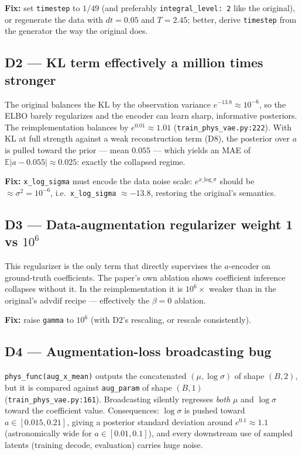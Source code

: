 \documentclass[11pt,a4paper]{article}
\newcommand{\code}[1]{\texttt{#1}}
\begin{document}
\textbf{Fix:} set \code{timestep} to $1/49$ (and preferably \code{integral\_level: 2}
like the original), or regenerate the data with $dt = 0.05$ and $T = 2.45$; better,
derive \code{timestep} from the generator the way the original does.

\subsection*{D2 --- KL term effectively a million times stronger}

The original balances the KL by the observation variance $e^{-13.8} \approx 10^{-6}$,
so the ELBO barely regularizes and the encoder can learn sharp, informative
posteriors. The reimplementation balances by $e^{0.01} \approx 1.01$
(\code{train\_phys\_vae.py:222}). With KL at full strength against a weak
reconstruction term (D8), the posterior over $a$ is pulled toward the prior ---
mean $0.055$ --- which yields an MAE of $\mathbb{E}|a - 0.055| \approx 0.025$: exactly
the collapsed regime.

\textbf{Fix:} \code{x\_log\_sigma} must encode the data noise scale: $e^{x\_\mathrm{log\_\sigma}}$
should be $\approx \sigma^2 = 10^{-6}$, i.e.\ \code{x\_log\_sigma} $\approx -13.8$,
restoring the original's semantics.

\subsection*{D3 --- Data-augmentation regularizer weight 1 vs $10^6$}

This regularizer is the only term that directly supervises the $a$-encoder on
ground-truth coefficients. The paper's own ablation shows coefficient inference
collapses without it. In the reimplementation it is $10^6\times$ weaker than in the
original's advdif recipe --- effectively the $\beta = 0$ ablation.

\textbf{Fix:} raise \code{gamma} to $10^6$ (with D2's rescaling, or rescale
consistently).

\subsection*{D4 --- Augmentation-loss broadcasting bug}

\code{phys\_func(aug\_x\_mean)} outputs the concatenated $(\mu, \log\sigma)$ of shape
$(B, 2)$, but it is compared against \code{aug\_param} of shape $(B, 1)$
(\code{train\_phys\_vae.py:161}). Broadcasting silently regresses \emph{both} $\mu$
and $\log\sigma$ toward the coefficient value. Consequences: $\log\sigma$ is pushed
toward $a \in [0.015, 0.21]$, giving a posterior standard deviation around
$e^{0.1} \approx 1.1$ (astronomically wide for $a \in [0.01, 0.1]$), and every
downstream use of sampled latents (training decode, evaluation) carries huge noise.
\end{document}
